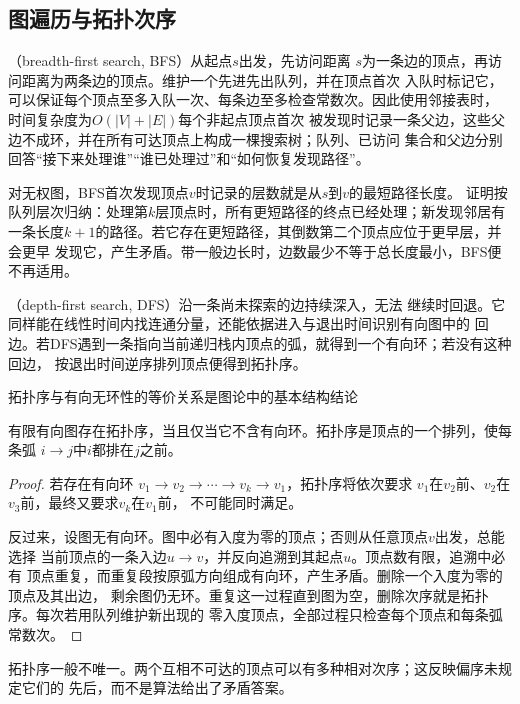 \subsection{图遍历与拓扑次序}

（breadth-first search, BFS）从起点\(s\)出发，先访问距离
\(s\)为一条边的顶点，再访问距离为两条边的顶点。维护一个先进先出队列，并在顶点首次
入队时标记它，可以保证每个顶点至多入队一次、每条边至多检查常数次。因此使用邻接表时，
时间复杂度为\(O(|V|+|E|)\)每个非起点顶点首次
被发现时记录一条父边，这些父边不成环，并在所有可达顶点上构成一棵搜索树；队列、已访问
集合和父边分别回答“接下来处理谁”“谁已处理过”和“如何恢复发现路径”。

对无权图，BFS首次发现顶点\(v\)时记录的层数就是从\(s\)到\(v\)的最短路径长度。
证明按队列层次归纳：处理第\(k\)层顶点时，所有更短路径的终点已经处理；新发现邻居有
一条长度\(k+1\)的路径。若它存在更短路径，其倒数第二个顶点应位于更早层，并会更早
发现它，产生矛盾。带一般边长时，边数最少不等于总长度最小，BFS便不再适用。

（depth-first search, DFS）沿一条尚未探索的边持续深入，无法
继续时回退。它同样能在线性时间内找连通分量，还能依据进入与退出时间识别有向图中的
回边。若DFS遇到一条指向当前递归栈内顶点的弧，就得到一个有向环；若没有这种回边，
按退出时间逆序排列顶点便得到拓扑序。

拓扑序与有向无环性的等价关系是图论中的基本结构结论
\begin{theorem}[DAG的拓扑排序]
  \label{thm:graph-theory-topological-order}
  有限有向图存在拓扑序，当且仅当它不含有向环。拓扑序是顶点的一个排列，使每条弧
  \(i\to j\)中\(i\)都排在\(j\)之前。
\end{theorem}

\begin{proof}
若存在有向环
\(v_1\to v_2\to\cdots\to v_k\to v_1\)，拓扑序将依次要求
\(v_1\)在\(v_2\)前、\(v_2\)在\(v_3\)前，最终又要求\(v_k\)在\(v_1\)前，
不可能同时满足。

反过来，设图无有向环。图中必有入度为零的顶点；否则从任意顶点\(v\)出发，总能选择
当前顶点的一条入边\(u\to v\)，并反向追溯到其起点\(u\)。顶点数有限，追溯中必有
顶点重复，而重复段按原弧方向组成有向环，产生矛盾。删除一个入度为零的顶点及其出边，
剩余图仍无环。重复这一过程直到图为空，删除次序就是拓扑序。每次若用队列维护新出现的
零入度顶点，全部过程只检查每个顶点和每条弧常数次。
\end{proof}

拓扑序一般不唯一。两个互相不可达的顶点可以有多种相对次序；这反映偏序未规定它们的
先后，而不是算法给出了矛盾答案。

